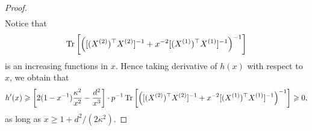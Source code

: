 \begin{proof}
\begin{align*}
\end{align*}
Notice that
$$\operatorname{Tr}\left[\left([(X^{(2)})^\top X^{(2)}]^{-1} + x^{-2} [(X^{(1)})^\top X^{(1)}]^{-1}\right)^{-1}\right]$$
is an increasing functions in $x$. Hence taking derivative of $h(x)$ with respect to $x$, we obtain that
\begin{align}\label{h'(A)1}
h'(x) \geqslant \left[2(1-x^{-1})\frac{\kappa^2}{x^2} - \frac{d^2}{x^3}\right] \cdot p^{-1} \operatorname{Tr}\left[\left([(X^{(2)})^\top X^{(2)}]^{-1} + x^{-2} [(X^{(1)})^\top X^{(1)}]^{-1}\right)^{-1}\right] \geqslant 0,
\end{align}
as long as $x \ge 1+d^2/(2\kappa^2)$.

\end{proof}
